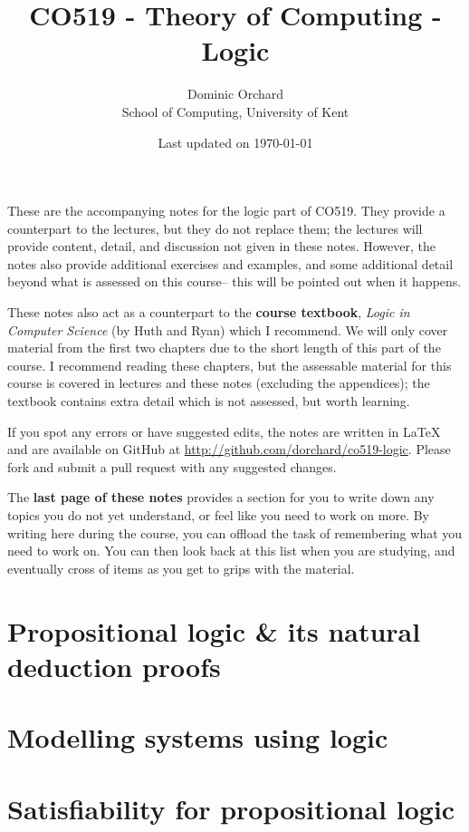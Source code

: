 \documentclass[a4paper]{article}
\title{\vspace{-2.5em}CO519 - Theory of Computing - Logic}
\author{Dominic Orchard \\
  {\small{School of Computing, University of Kent}}}
\date{Last updated on \today}
\theoremstyle{definition}
\begin{document}
\maketitle

\noindent
These are the accompanying notes for the logic part of CO519. They
provide a counterpart to the lectures, but they do not replace them; the
lectures will provide content, detail, and discussion not given in
these notes.  However, the notes also provide additional exercises and
examples, and some additional detail beyond what is assessed on this
course-- this will be pointed out when it happens.

These notes also act as a counterpart to the \textbf{course textbook},
\emph{Logic in Computer Science} (by Huth and Ryan) which I
recommend. We will only cover material from the first two chapters due
to the short length of this part of the course. I recommend reading
these chapters, but the assessable material for this course is
covered in lectures and these notes (excluding the appendices); the
textbook contains extra detail which is not assessed, but
worth learning.

If you spot any errors or have suggested edits, the notes are written
in LaTeX and are available on GitHub at
\url{http://github.com/dorchard/co519-logic}. Please fork and submit a
pull request with any suggested changes.

The \textbf{last page of these notes} provides a section for you to
write down any topics you do not yet understand, or feel like you need to
work on more. By writing here during the course, you can offload the task of remembering
what you need to work on. You can then look back at this list when you
are studying, and eventually cross of items as you get to grips with
the material.

\part{Propositional logic \& its natural deduction
      proofs}



\part{Modelling systems using logic}
\setcounter{section}{0}



\part{Satisfiability for propositional logic}
\setcounter{section}{0}
\end{document}
